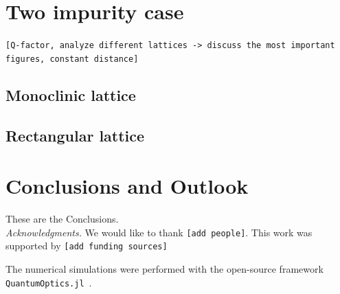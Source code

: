 \documentclass[aps,pra,superscriptaddress,twocolumn]{revtex4-1}
\newcommand{\commentSO}[1]{\texttt{\color{orange}[#1]}}
\begin{document}
\section{Two impurity case}
\commentSO{Q-factor, analyze different lattices -> discuss the most important figures, constant distance}

\subsection{Monoclinic lattice}


\subsection{Rectangular lattice}


\section{Conclusions and Outlook}\label{sec:conclusion}

These are the Conclusions.\\[2ex]

\emph{Acknowledgments.} We would like to thank \commentSO{add people}. This work was supported by \commentSO{add funding sources}

The numerical simulations were performed with the open-source framework \texttt{QuantumOptics.jl}~\cite{kramer_quantumopticsjl_2018}.




\end{document}
